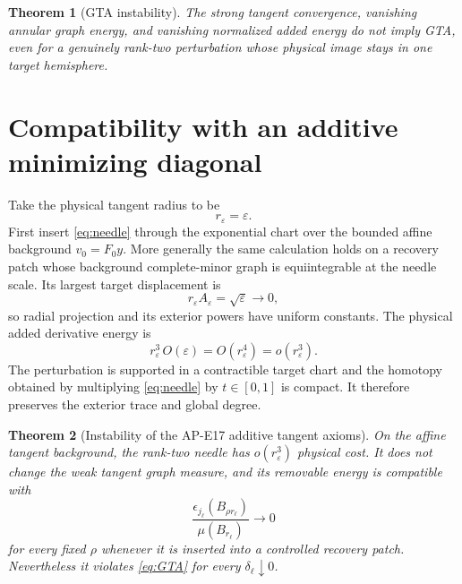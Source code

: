\documentclass[10pt]{article}
\newtheorem{theorem}{Theorem}[section]
\begin{document}
\begin{theorem}[GTA instability]
The strong tangent convergence, vanishing annular graph energy, and
vanishing normalized added energy do not imply GTA, even for a genuinely
rank-two perturbation whose physical image stays in one target hemisphere.
\end{theorem}

\section{Compatibility with an additive minimizing diagonal}

Take the physical tangent radius to be
\begin{equation}
 r_\varepsilon=\varepsilon.                            \label{eq:r}
\end{equation}
First insert \eqref{eq:needle} through the exponential chart over the
bounded affine background $v_0=F_0y$.  More generally the same calculation
holds on a recovery patch whose background complete-minor graph is
equiintegrable at the needle scale.  Its largest target displacement is
\begin{equation}
 r_\varepsilon A_\varepsilon=\sqrt\varepsilon\to0,     \label{eq:hemisphere}
\end{equation}
so radial projection and its exterior powers have uniform constants.  The
physical added derivative energy is
\begin{equation}
 r_\varepsilon^3\,O(\varepsilon)
 =O(r_\varepsilon^4)=o(r_\varepsilon^3).               \label{eq:physical}
\end{equation}
The perturbation is supported in a contractible target chart and the
homotopy obtained by multiplying \eqref{eq:needle} by $t\in[0,1]$ is compact.
It therefore preserves the exterior trace and global degree.

\begin{theorem}[Instability of the AP-E17 additive tangent axioms]
On the affine tangent background, the rank-two needle has
$o(r_\varepsilon^3)$ physical cost.  It does not change the weak tangent
graph measure, and its removable energy is compatible with
\begin{equation}
 \frac{\epsilon_{j_\ell}(B_{\rho r_\ell})}
      {\mu(B_{r_\ell})}\longrightarrow0
\end{equation}
for every fixed $\rho$ whenever it is inserted into a controlled recovery
patch.  Nevertheless it violates
\eqref{eq:GTA} for every $\delta_\ell\downarrow0$.
\end{theorem}
\end{document}
